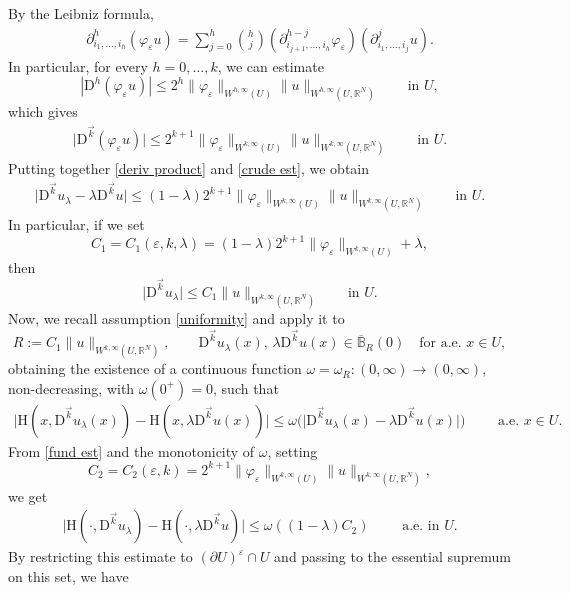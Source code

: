 \documentclass[a4paper,11pt]{article}
\numberwithin{equation}{section}
\newcommand{\numberset}{\mathbb}
\newcommand{\eps}{\varepsilon}
\newcommand{\R}{\numberset{R}}
\newcommand{\rom}{\mathrm}
\theoremstyle{definition}
\begin{document}
By the Leibniz formula,
\begin{align*}
\partial ^h_{i_1,\ldots,i_h}(\varphi_\eps u)=\sum_{j=0}^h \binom{h}{j}(\partial^{h-j}_{i_{j+1},\ldots, i_h} \varphi_\eps)(\partial^{j}_{i_{1},\ldots, i_j} u).
\end{align*}
In particular, for every $h=0,\ldots, k$, we can estimate
$$
|\mathrm D^h(\varphi_\eps u)|\leq 2^h\|\varphi_\eps\|_{W^{h,\infty}(U)}\|u\|_{W^{h,\infty}(U,\R^N)}\qquad \mbox{in }U, 
$$
which gives
\begin{align}\label{crude est}
\big| \mathrm D^{\vec{k}}(\varphi_\eps u) \big|\leq 2^{k+1}\|\varphi_\eps\|_{W^{k,\infty}(U)}\|u\|_{W^{k,\infty}(U,\R^N)}\qquad \mbox{in }U.
\end{align}
Putting together \eqref{deriv product} and \eqref{crude est}, we obtain
\begin{align}\label{fund est}
\big|  \mathrm D^{\vec{k}}u_\lambda-\lambda \mathrm D^{\vec{k}}u \big|  \leq(1-\lambda)2^{k+1}\|\varphi_\eps\|_{W^{k,\infty}(U)}\|u\|_{W^{k,\infty}(U,\R^N)}\qquad\mbox{in }U.
\end{align}
In particular, if we set 
$$C_1=C_1(\eps,k,\lambda)=(1-\lambda)2^{k+1}\|\varphi_\eps\|_{W^{k,\infty}(U)}+\lambda,$$
then
$$
\big|  \mathrm D^{\vec{k}}u_\lambda \big|  \leq C_1\|u\|_{W^{k,\infty}(U,\R^N)}\qquad\mbox{in }U.
$$
Now, we recall assumption \eqref{uniformity} and apply it to 
$$
R:=C_1\|u\|_{W^{k,\infty}(U,\R^N)}, \qquad\mathrm D^{\vec{k}}u_\lambda(x),\,\lambda\mathrm D^{\vec{k}}u(x)\in \overline{\mathbb B}_R(0)\quad\mbox{for a.e.   }x\in U,
$$
obtaining the existence of a continuous function $\omega=\omega_R:(0,\infty)\longrightarrow (0,\infty)$, non-decreasing, with $\omega(0^+)=0$, such that
\begin{align*}
\Big| \rom{H}(x,\mathrm D^{\vec{k}}u_\lambda(x))-\rom{H}(x,\lambda\mathrm D^{\vec{k}}u(x))\Big| \leq \omega\big(\big|\mathrm D^{\vec{k}}u_\lambda(x)-\lambda\mathrm D^{\vec{k}}u(x) \big|\big)\qquad\mbox{ a.e. }x\in U.
\end{align*} 
From \eqref{fund est} and the monotonicity of $\omega$, setting
$$
C_2=C_2(\eps,k)=2^{k+1}\|\varphi_\eps\|_{W^{k,\infty}(U)}\|u\|_{W^{k,\infty}(U,\R^N)},
$$
we get
\begin{align*}
\Big| \rom{H}(\cdot,\mathrm D^{\vec{k}}u_\lambda)-\rom{H}(\cdot,\lambda\mathrm D^{\vec{k}}u) \Big|\leq \omega\left((1-\lambda)C_2\right)\qquad\mbox{ a.e. in } U.
\end{align*}
By restricting this estimate to $(\partial U)^\eps\cap U$ and passing to the essential supremum on this set, we have
\end{document}
